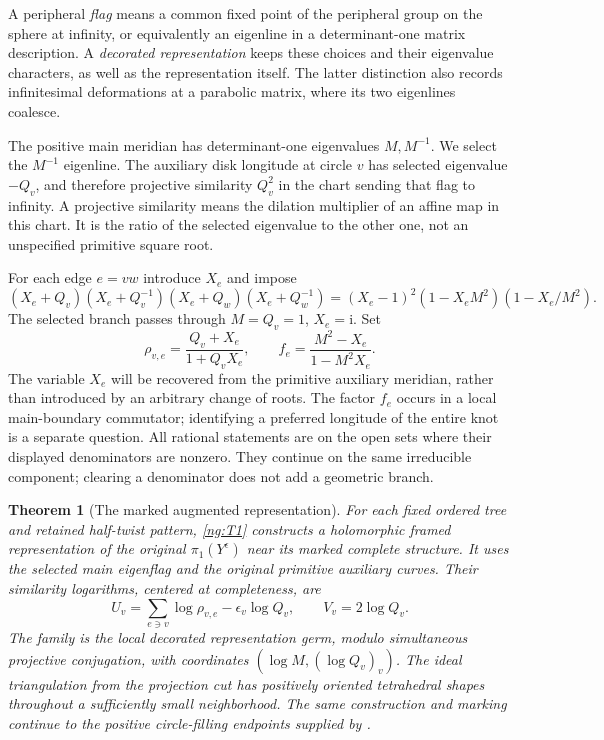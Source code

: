 \documentclass[11pt]{article}
\numberwithin{equation}{section}
\newtheorem{theorem}{Theorem}[section]
\theoremstyle{definition}\newtheorem{definition}[theorem]{Definition}
\theoremstyle{remark}\newtheorem{remark}[theorem]{Remark}
\newcommand{\ii}{\mathrm i}
\begin{document}
A peripheral \emph{flag} means a common fixed point of the peripheral
group on the sphere at infinity, or equivalently an eigenline in a
determinant-one matrix description. A \emph{decorated representation}
keeps these choices and their eigenvalue characters, as well as the
representation itself. The latter distinction also records infinitesimal
deformations at a parabolic matrix, where its two eigenlines coalesce.

The positive main meridian has determinant-one eigenvalues $M,M^{-1}$.
We select the $M^{-1}$ eigenline. The auxiliary disk longitude at
circle $v$ has selected eigenvalue $-Q_v$, and therefore projective
similarity $Q_v^2$ in the chart sending that flag to infinity.
A projective similarity means the dilation multiplier of an affine
map in this chart. It is the ratio of the selected eigenvalue to the
other one, not an unspecified primitive square root.

For each edge $e=vw$ introduce $X_e$ and impose
\begin{equation}\label{ng:T1}
 (X_e+Q_v)(X_e+Q_v^{-1})(X_e+Q_w)(X_e+Q_w^{-1})
 =(X_e-1)^2(1-X_eM^2)(1-X_e/M^2).
\end{equation}
The selected branch passes through $M=Q_v=1$, $X_e=\ii$.
Set
\begin{equation}\label{ng:T2}
 \rho_{v,e}=\frac{Q_v+X_e}{1+Q_vX_e},
 \qquad f_e=\frac{M^2-X_e}{1-M^2X_e}.
\end{equation}
The variable $X_e$ will be recovered from the primitive auxiliary
meridian, rather than introduced by an arbitrary change of roots.
The factor $f_e$ occurs in a local main-boundary commutator; identifying
a preferred longitude of the entire knot is a separate question.
All rational statements are on the open sets where their displayed
denominators are nonzero. They continue on the same irreducible
component; clearing a denominator does not add a geometric branch.

\begin{theorem}[The marked augmented representation]\label{ng:representation}
For each fixed ordered tree and retained half-twist pattern,
\eqref{ng:T1} constructs a holomorphic framed representation of the
original $\pi_1(Y^\epsilon)$ near its marked complete structure.
It uses the selected main eigenflag and the original primitive
auxiliary curves. Their similarity logarithms, centered at completeness,
are
\begin{equation}\label{ng:T3}
 U_v=\sum_{e\ni v}\log\rho_{v,e}-\epsilon_v\log Q_v,
 \qquad V_v=2\log Q_v .
\end{equation}
The family is the local decorated representation germ, modulo
simultaneous projective conjugation, with coordinates
$(\log M,(\log Q_v)_v)$.
The ideal triangulation from the projection cut has positively
oriented tetrahedral shapes throughout a sufficiently small neighborhood.
The same construction and marking continue to the positive
circle-filling endpoints supplied by \cite[Theorem~1.1 or
Theorem~7.1]{Circle}.
\end{theorem}
\end{document}
